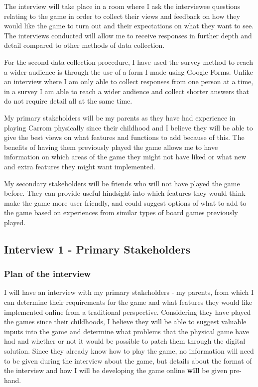 \documentclass[11pt,a4paper]{report}
\begin{document}
\noindent The interview will take place in a room where I ask the interviewee questions relating to the game in order to collect their views and feedback on how they would like the game to turn out and their expectations on what they want to see. The interviews conducted will allow me to receive responses in further depth and detail compared to other methods of data collection. \newline

\noindent For the second data collection procedure, I have used the survey method to reach a wider audience is through the use of a form I made using Google Forms. Unlike an interview where I am only able to collect responses from one person at a time, in a survey I am able to reach a wider audience and collect shorter answers that do not require detail all at the same time. \newline

\noindent My primary stakeholders will be my parents as they have had experience in playing Carrom physically since their childhood and I believe they will be able to give the best views on what features and functions to add because of this. The benefits of having them previously played the game allows me to have information on which areas of the game they might not have liked or what new and extra features they might want implemented. \newline

\noindent My secondary stakeholders will be friends who will not have played the game before. They can provide useful hindsight into which features they would think make the game more user friendly, and could suggest options of what to add to the game based on experiences from similar types of board games previously played.

\subsection{Interview 1 - Primary Stakeholders}


\subsubsection{Plan of the interview}
I will have an interview with my primary stakeholders - my parents, from which I can determine their requirements for the game and what features they would like implemented online from a traditional perspective. Considering they have played the games since their childhoods, I believe they will be able to suggest valuable inputs into the game and determine what problems that the physical game have had and whether or not it would be possible to patch them through the digital solution. Since they already know how to play the game, no information will need to be given during the interview about the game, but details about the format of the interview and how I will be developing the game online \textbf{will} be given pre-hand. \newline
\end{document}
